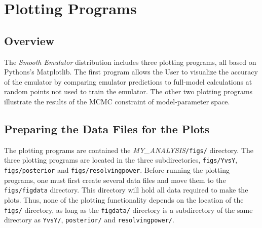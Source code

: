 \documentclass[UserManual.tex]{subfiles}
\begin{document}
\begin{sloppypar}

\section{Plotting Programs}\label{sec:figs}

\subsection{Overview}
The {\it Smooth Emulator} distribution includes three plotting programs, all based on Pythons's Matplotlib. The first program allows the User to visualize the accuracy of the emulator by comparing emulator predictions to full-model calculations at random points not used to train the emulator. The other two plotting programs illustrate the results of the MCMC constraint of model-parameter space.

\subsection{Preparing the Data Files for the Plots}
The plotting programs are contained the \textit{MY\_ANALYSIS}{\tt /figs/} directory. The three plotting programs are located in the three subdirectories, {\tt figs/YvsY}, {\tt figs/posterior} and {\tt figs/resolvingpower}. Before running the plotting programs, one must first create several data files and move them to the {\tt figs/figdata} directory. This directory will hold all data required to make the plots. Thus, none of the plotting functionality depends on the location of the {\tt figs/} directory, as long as the {\tt figdata/} directory is a subdirectory of the same directory as {\tt YvsY/}, {\tt posterior/} and {\tt resolvingpower/}.


\end{sloppypar}
\end{document}
